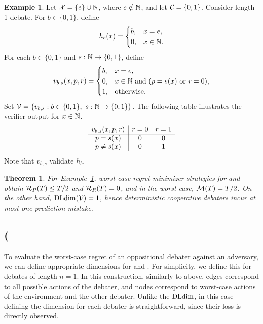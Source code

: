 \documentclass[11pt,letterpaper]{article}
\newtheorem{theorem}{Theorem}
\theoremstyle{definition}
\newtheorem{example}{Example}
\theoremstyle{plain}
\begin{document}
\begin{example}\label{ex:reggap}
Let ${\mathcal X}=\{e\}\cup\mathbb{N}$, where $e\notin\mathbb{N}$, and let
${{\mathcal C}}=\{0,1\}$. Consider length-1 debate. For $b\in\{0,1\}$, define
\[
h_b(x)=
\begin{cases}
b,&x=e,\\
0,&x\in\mathbb{N}.
\end{cases}
\]
For each $b\in\{0,1\}$ and $s:\mathbb{N}\to\{0,1\}$, define
\[
v_{b,s}(x,p,r)=
\begin{cases}
b,&x=e,\\
0,&x\in\mathbb{N}\text{ and }(p=s(x)\text{ or }r=0),\\
1,&\text{otherwise}.
\end{cases}
\]
Set $\V=\{v_{b,s}:b\in\{0,1\},\ s:\naturals\to\{0,1\}\}$.
The following table illustrates the verifier output for $x \in \mathbb{N}$.
\[
\begin{array}{c|cc}
v_{b,s}(x,{p},{r}) &{r}=0&{r}=1\\\hline
{p}=s(x)&0&0\\
{p} \ne s(x)&0&1
\end{array}
\]
Note that $v_{b,s}$ validate $h_b$.
\end{example}

\begin{theorem}\label{thm:reggap}
For Example~\ref{ex:reggap}, worst-case regret minimizer strategies for \df and \dt obtain ${{\mathcal R}_P}(T) \leq T/2$ and ${{\mathcal R}_R}(T) = 0$, and in the worst case, ${\mathcal M}(T) = T/2$.
On the other hand, $\mathrm{DLdim}({\mathcal V}) = 1$, hence deterministic cooperative debaters incur at most one prediction mistake. 
\end{theorem}












\iffalse
\subsection{(}

To evaluate the worst-case regret of an oppositional debater against an adversary, we can define appropriate dimensions for \dt and \df.
For simplicity, we define this for debates of length $n=1$. 
In this construction, similarly to above, edges correspond to all possible actions of the debater, and nodes correspond to worst-case actions of the environment and the other debater. Unlike the $\mathrm{DLdim}$, in this case defining the dimension for each debater is straightforward, since their loss is directly observed. 
\end{document}
